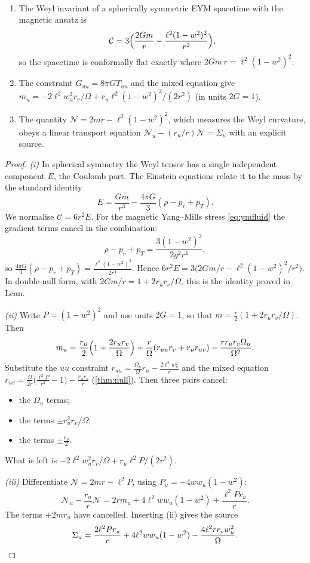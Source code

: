 \begin{theorem}\label{thm:weyl}\ver\
\begin{enumerate}[label=(\roman*)]
\item The Weyl invariant of a spherically symmetric EYM spacetime with the magnetic ansatz is
\[
\mathcal C=3\Bigl(\frac{2Gm}{r}-\frac{\ell^2(1-w^2)^2}{r^2}\Bigr),
\]
so the spacetime is conformally flat exactly where $2Gm\,r=\ell^2(1-w^2)^2$.
\item The constraint $G_{uu}=8\pi GT_{uu}$ and the mixed equation give $m_u=-2\ell^2w_u^2r_v/\Omega+r_u\ell^2(1-w^2)^2/(2r^2)$ (in units $2G=1$).
\item The quantity $\mathcal N=2mr-\ell^2(1-w^2)^2$, which measures the Weyl curvature, obeys a linear transport equation $\mathcal N_u-(r_u/r)\mathcal N=\Sigma_u$ with an explicit source.
\end{enumerate}
\end{theorem}
\begin{proof}
\emph{(i)} In spherical symmetry the Weyl tensor has a single independent component $E$, the Coulomb part. The Einstein equations relate it to the mass by the standard identity
\[
E=\frac{Gm}{r^3}-\frac{4\pi G}3(\rho-p_r+p_T).
\]
We normalise $\mathcal C=6r^2E$. For the magnetic Yang--Mills stress \eqref{eq:ymfluid} the gradient terms cancel in the combination:
\[
\rho-p_r+p_T=\frac{3(1-w^2)^2}{2g^2r^4},
\]
so $\frac{4\pi G}3(\rho-p_r+p_T)=\frac{\ell^2(1-w^2)^2}{2r^4}$. Hence $6r^2E=3\bigl(2Gm/r-\ell^2(1-w^2)^2/r^2\bigr)$. In double-null form, with $2Gm/r=1+2r_ur_v/\Omega$, this is the identity proved in Lean.

\emph{(ii)} Write $P=(1-w^2)^2$ and use units $2G=1$, so that $m=\frac r2(1+2r_ur_v/\Omega)$. Then
\[
m_u=\frac{r_u}2\Bigl(1+\frac{2r_ur_v}\Omega\Bigr)+\frac r\Omega(r_{uu}r_v+r_ur_{uv})-\frac{rr_ur_v\Omega_u}{\Omega^2}.
\]
Substitute the $uu$ constraint $r_{uu}=\frac{\Omega_u}\Omega r_u-\frac{2\ell^2w_u^2}r$ and the mixed equation $r_{uv}=\frac\Omega{2r}\bigl(\frac{\ell^2P}{r^2}-1\bigr)-\frac{r_ur_v}r$ (\cref{thm:null}). Then three pairs cancel:
\begin{itemize}[nosep]
\item the $\Omega_u$ terms;
\item the terms $\pm r_u^2r_v/\Omega$;
\item the terms $\pm\frac{r_u}2$.
\end{itemize}
What is left is $-2\ell^2w_u^2r_v/\Omega+r_u\ell^2P/(2r^2)$.

\emph{(iii)} Differentiate $\mathcal N=2mr-\ell^2P$, using $P_u=-4ww_u(1-w^2)$:
\[
\mathcal N_u-\frac{r_u}r\mathcal N=2rm_u+4\ell^2ww_u(1-w^2)+\frac{\ell^2Pr_u}r .
\]
The terms $\pm2mr_u$ have cancelled. Inserting (ii) gives the source
\[
\Sigma_u=\frac{2\ell^2Pr_u}r+4\ell^2ww_u(1-w^2)-\frac{4\ell^2rr_vw_u^2}\Omega .\qedhere
\]
\end{proof}


